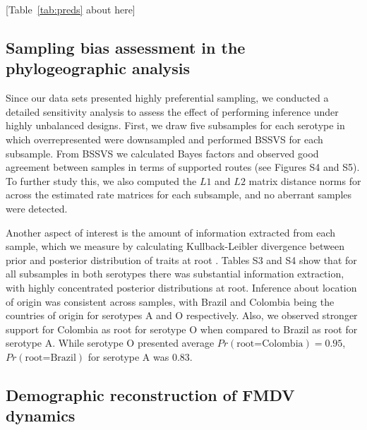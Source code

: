 \documentclass[10pt]{article}
\begin{document}
\begin{center}
 [Table~\ref{tab:preds} about here]
\end{center}

\subsection*{Sampling bias assessment in the phylogeographic analysis}
Since our data sets presented highly preferential sampling, we conducted a detailed sensitivity analysis to assess the effect of performing inference under highly unbalanced designs.
First, we draw five subsamples for each serotype in which overrepresented were downsampled and performed BSSVS for each subsample.
From BSSVS we calculated Bayes factors and observed good agreement between samples in terms of supported routes (see Figures S4 and S5). %
To further study this, we also computed the $L1$ and $L2$ matrix distance norms for across the estimated rate matrices for each subsample, and no aberrant samples were detected.

Another aspect of interest is the amount of information extracted from each sample, which we measure by calculating Kullback-Leibler divergence between prior and posterior distribution of traits at root \cite{roots}.
Tables S3 and S4 show that for all subsamples in both serotypes there was substantial information extraction, with highly concentrated posterior distributions at root.
Inference about location of origin was consistent across samples, with Brazil and Colombia being the countries of origin for serotypes A and O respectively.
Also, we observed stronger support for Colombia as root for serotype O when compared to Brazil as root for serotype A.
While serotype O presented average $Pr(\text{root=Colombia})=0.95$, $Pr(\text{root=Brazil})$ for serotype A was $0.83$.
\subsection*{Demographic reconstruction of FMDV dynamics}
\end{document}
